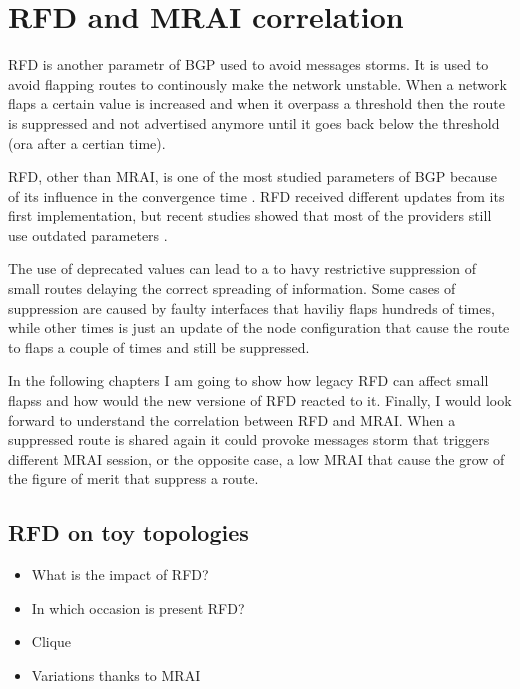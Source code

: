 \chapter{RFD and MRAI correlation}
\label{cha:bgp_rfd}


\ac{RFD} is another parametr of \ac{BGP} used to avoid messages storms.
It is used to avoid flapping routes to continously make the network unstable.
When a network flaps a certain value is increased and when it overpass a threshold
then the route is suppressed and not advertised anymore until it goes back
below the threshold (ora after a certian time).

\ac{RFD}, other than \ac{MRAI}, is one of the most studied parameters of \ac{BGP}
because of its influence in the convergence time \cite{mao2002route,pelsser2011route}.
\ac{RFD} received different updates from its first implementation, but recent 
studies showed that most of the providers still use outdated parameters  \cite{gray2020bgp}.

The use of deprecated values can lead to a to havy restrictive suppression
of small routes delaying the correct spreading of information.
Some cases of suppression are caused by faulty interfaces that haviliy flaps hundreds of times, 
while other times is just an update of the node configuration that
cause the route to flaps a couple of times and still be suppressed.

In the following chapters I am going to show how legacy \ac{RFD} can affect 
small flapss and how would the new versione of \ac{RFD} reacted to it.
Finally, I would look forward to understand the correlation between \ac{RFD}
and \ac{MRAI}.
When a suppressed route is shared again it could provoke messages storm that
triggers different \ac{MRAI} session, or the opposite case, a low \ac{MRAI} that
cause the grow of the figure of merit that suppress a route.

\section{RFD on toy topologies}
\label{sec:bgp_rfd_toy}

\begin{itemize}
    \item What is the impact of RFD?
    \item In which occasion is present RFD?
    \item Clique
    \item Variations thanks to MRAI
\end{itemize}

